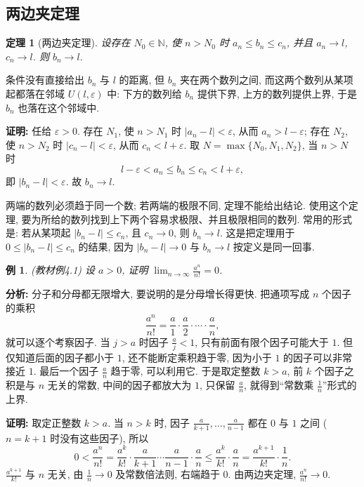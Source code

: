 \documentclass[UTF8,openany]{ctexbook}
\theoremstyle{chinesetextbook}
\newtheorem{example}{例}[section]
\newtheorem{theorem}{定理}[section]
\newenvironment{cnproof}{\par\indent\textbf{证明:} \ignorespaces}{\par}
\begin{document}
\subsection{两边夹定理}
\begin{theorem}[两边夹定理]
设存在 $N_0\in\mathbb N$, 使 $n>N_0$ 时 $a_n\le b_n\le c_n$, 并且 $a_n\to l$, $c_n\to l$. 则 $b_n\to l$.
\end{theorem}
条件没有直接给出 $b_n$ 与 $l$ 的距离, 但 $b_n$ 夹在两个数列之间, 而这两个数列从某项起都落在邻域 $U(l,\varepsilon)$ 中: 下方的数列给 $b_n$ 提供下界, 上方的数列提供上界, 于是 $b_n$ 也落在这个邻域中.
\begin{cnproof}
任给 $\varepsilon>0$. 存在 $N_1$, 使 $n>N_1$ 时 $|a_n-l|<\varepsilon$, 从而 $a_n>l-\varepsilon$; 存在 $N_2$, 使 $n>N_2$ 时 $|c_n-l|<\varepsilon$, 从而 $c_n<l+\varepsilon$. 取 $N=\max\{N_0,N_1,N_2\}$, 当 $n>N$ 时
\[
l-\varepsilon<a_n\le b_n\le c_n<l+\varepsilon,
\]
即 $|b_n-l|<\varepsilon$. 故 $b_n\to l$.
\end{cnproof}
两端的数列必须趋于同一个数; 若两端的极限不同, 定理不能给出结论. 使用这个定理, 要为所给的数列找到上下两个容易求极限、并且极限相同的数列. 常用的形式是: 若从某项起 $|b_n-l|\le c_n$, 且 $c_n\to0$, 则 $b_n\to l$. 这是把定理用于 $0\le|b_n-l|\le c_n$ 的结果, 因为 $|b_n-l|\to0$ 与 $b_n\to l$ 按定义是同一回事.
\begin{example}
\textnormal{(教材例4.1)} 设 $a>0$, 证明 $\displaystyle\lim_{n\to\infty}\frac{a^n}{n!}=0$.
\end{example}
\par\indent\textbf{分析:} 分子和分母都无限增大, 要说明的是分母增长得更快. 把通项写成 $n$ 个因子的乘积
\[
\frac{a^n}{n!}=\frac a1\cdot\frac a2\cdot\cdots\cdot\frac an,
\]
就可以逐个考察因子. 当 $j>a$ 时因子 $\displaystyle\frac aj<1$, 只有前面有限个因子可能大于 $1$. 但仅知道后面的因子都小于 $1$, 还不能断定乘积趋于零, 因为小于 $1$ 的因子可以非常接近 $1$. 最后一个因子 $\displaystyle\frac an$ 趋于零, 可以利用它. 于是取定整数 $k>a$, 前 $k$ 个因子之积是与 $n$ 无关的常数, 中间的因子都放大为 $1$, 只保留 $\displaystyle\frac an$, 就得到“常数乘 $\displaystyle\frac1n$”形式的上界.
\begin{cnproof}
取定正整数 $k>a$. 当 $n>k$ 时, 因子 $\displaystyle\frac a{k+1},\ldots,\frac a{n-1}$ 都在 $0$ 与 $1$ 之间 ($n=k+1$ 时没有这些因子), 所以
\[
0<\frac{a^n}{n!}=\frac{a^k}{k!}\cdot\frac a{k+1}\cdots\frac a{n-1}\cdot\frac an\le\frac{a^k}{k!}\cdot\frac an=\frac{a^{k+1}}{k!}\cdot\frac1n.
\]
$\displaystyle\frac{a^{k+1}}{k!}$ 与 $n$ 无关, 由 $\displaystyle\frac1n\to0$ 及常数倍法则, 右端趋于 $0$. 由两边夹定理, $\displaystyle\frac{a^n}{n!}\to0$.
\end{cnproof}
\end{document}
